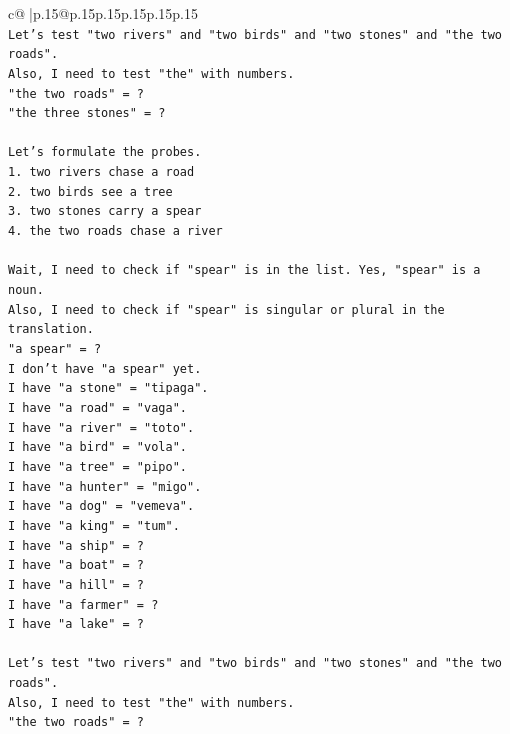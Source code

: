 \documentclass{article}
\begin{document}
{\begin{supertabular}{c@{$\;$}|p{.15\linewidth}@{}p{.15\linewidth}p{.15\linewidth}p{.15\linewidth}p{.15\linewidth}p{.15\linewidth}}
{{{\\ 
\texttt{Let's test "two rivers" and "two birds" and "two stones" and "the two roads".} \\
\texttt{Also, I need to test "the" with numbers.} \\
\texttt{"the two roads" = ?} \\
\texttt{"the three stones" = ?} \\
\\ 
\texttt{Let's formulate the probes.} \\
\texttt{1. two rivers chase a road} \\
\texttt{2. two birds see a tree} \\
\texttt{3. two stones carry a spear} \\
\texttt{4. the two roads chase a river} \\
\\ 
\texttt{Wait, I need to check if "spear" is in the list. Yes, "spear" is a noun.} \\
\texttt{Also, I need to check if "spear" is singular or plural in the translation.} \\
\texttt{"a spear" = ?} \\
\texttt{I don't have "a spear" yet.} \\
\texttt{I have "a stone" = "tipaga".} \\
\texttt{I have "a road" = "vaga".} \\
\texttt{I have "a river" = "toto".} \\
\texttt{I have "a bird" = "vola".} \\
\texttt{I have "a tree" = "pipo".} \\
\texttt{I have "a hunter" = "migo".} \\
\texttt{I have "a dog" = "vemeva".} \\
\texttt{I have "a king" = "tum".} \\
\texttt{I have "a ship" = ?} \\
\texttt{I have "a boat" = ?} \\
\texttt{I have "a hill" = ?} \\
\texttt{I have "a farmer" = ?} \\
\texttt{I have "a lake" = ?} \\
\\ 
\texttt{Let's test "two rivers" and "two birds" and "two stones" and "the two roads".} \\
\texttt{Also, I need to test "the" with numbers.} \\
\texttt{"the two roads" = ?} \\
}}}
\end{supertabular}}
\end{document}
